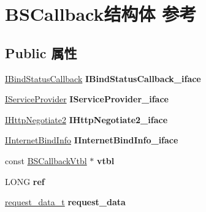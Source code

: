 \hypertarget{struct_b_s_callback}{}\section{B\+S\+Callback结构体 参考}
\label{struct_b_s_callback}
\subsection*{Public 属性}
\begin{DoxyCompactItemize}
\item 
\mbox{\label{struct_b_s_callback_a2294f090663e7190b8355bbb5421fc01}} 
\hyperlink{interface_i_bind_status_callback}{I\+Bind\+Status\+Callback} {\bfseries I\+Bind\+Status\+Callback\+\_\+iface}
\item 
\mbox{\label{struct_b_s_callback_a9d17536e17091463c1cd8d7a2a67579c}} 
\hyperlink{interface_i_service_provider}{I\+Service\+Provider} {\bfseries I\+Service\+Provider\+\_\+iface}
\item 
\mbox{\label{struct_b_s_callback_a10f5eaf6e660439c9d6e3fb1fb96f3ab}} 
\hyperlink{interface_i_http_negotiate2}{I\+Http\+Negotiate2} {\bfseries I\+Http\+Negotiate2\+\_\+iface}
\item 
\mbox{\label{struct_b_s_callback_a25223c8562cb4269af873ebaf659f734}} 
\hyperlink{interface_i_internet_bind_info}{I\+Internet\+Bind\+Info} {\bfseries I\+Internet\+Bind\+Info\+\_\+iface}
\item 
\mbox{\label{struct_b_s_callback_ace6c7b3164b44dd624158a386b8c8ab8}} 
const \hyperlink{struct_b_s_callback_vtbl}{B\+S\+Callback\+Vtbl} $\ast$ {\bfseries vtbl}
\item 
\mbox{\label{struct_b_s_callback_a6f1529b58be518829018dfd41d1e6a2c}} 
L\+O\+NG {\bfseries ref}
\item 
\mbox{\label{struct_b_s_callback_a8c64de41ad42e24719c4d65c373b6bbc}} 
\hyperlink{structrequest__data__t}{request\+\_\+data\+\_\+t} {\bfseries request\+\_\+data}
\item 
\mbox{\label{struct_b_s_callback_a385a0e173d8f52940455336fc19c9c1b}} 

\end{DoxyCompactItemize}
